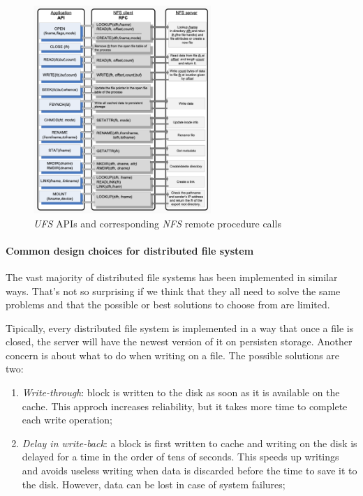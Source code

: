 \begin{figure}[h!]
    \centering
    \includegraphics[width=0.6\textwidth]{images/nfs-remote-calls.png}
    \caption{\emph{UFS} APIs and corresponding \emph{NFS} remote procedure calls}
\end{figure}

\paragraph{Common design choices for distributed file system}
The vast majority of distributed file systems has been implemented in similar
ways. That's not so surprising if we think that they all need to solve the same
problems and that the possible or best solutions to choose from are limited.

Tipically, every distributed file system is implemented in a way that once a file
is closed, the server will have the newest version of it on persisten storage.
Another concern is about what to do when writing on a file. The possible
solutions are two:
\begin{enumerate}
    \item \emph{Write-through}: block is written to the disk as soon as it is
    available on the cache. This approch increases reliability, but it takes more
    time to complete each write operation;
    \item \emph{Delay in write-back}: a block is first written to cache and
    writing on the disk is delayed for a time in the order of tens of seconds.
    This speeds up writings and avoids useless writing when data is discarded
    before the time to save it to the disk. However, data can be lost in case
    of system failures;
\end{enumerate}

